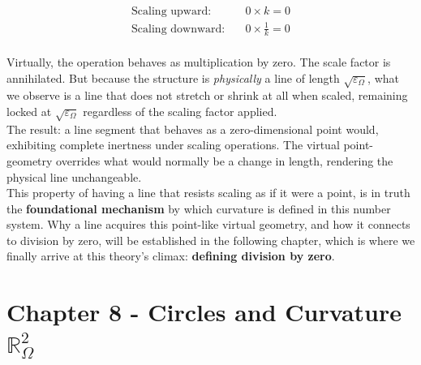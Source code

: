\documentclass{article}
\begin{document}
\begin{align*}
\text{Scaling upward:} & \quad 0 \times k = 0 \\
\text{Scaling downward:} & \quad 0 \times \frac{1}{k} = 0
\end{align*}
\\Virtually, the operation behaves as multiplication by zero. The scale factor is annihilated. But because the structure is \textit{physically} a line of length $\sqrt{\varepsilon_\Omega}$, what we observe is a line that does not stretch or shrink at all when scaled, remaining locked at $\sqrt{\varepsilon_\Omega}$ regardless of the scaling factor applied.
\\The result: a line segment that behaves as a zero-dimensional point would, exhibiting complete inertness under scaling operations. The virtual point-geometry overrides what would normally be a change in length, rendering the physical line unchangeable.
\\This property of having a line that resists scaling as if it were a point, is in truth the \textbf{foundational mechanism} by which curvature is defined in this 
number system. Why a line acquires this point-like virtual geometry, 
and how it connects to division by zero, will be established in the 
following chapter, which is where we finally arrive at this theory's 
climax: \textbf{defining division by zero}.

\newpage

\section{Chapter 8 - Circles and Curvature $\mathbb{R}_\Omega^2$} 
\end{document}
